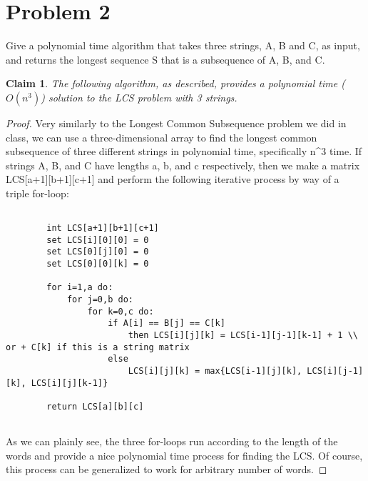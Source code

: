 \documentclass{article}
\author{Isaac B Goss\\ James Hahn\\ Jonathan Dyer}
\title{}
\date{}
\newtheorem{thm}{Claim}
\providecommand{\prob}[1]{\section*{Problem #1}}
\begin{document}
\maketitle

\prob{2}
Give a polynomial time algorithm that takes three strings, A, B and C, as input, and returns the longest sequence S that is a subsequence of A, B, and C.

\begin{thm}
The following algorithm, as described, provides a polynomial time ($O(n^3)$) solution to the LCS problem with 3 strings.
\end{thm}

\begin{proof}
    Very similarly to the Longest Common Subsequence problem we did in class, we can use a three-dimensional array to find the longest common subsequence of three different strings in polynomial time, specifically n^3 time. If strings A, B, and C have lengths a, b, and c respectively, then we make a matrix LCS[a+1][b+1][c+1] and perform the following iterative process by way of a triple for-loop:
    
    \begin{lstlisting}

        int LCS[a+1][b+1][c+1]
        set LCS[i][0][0] = 0
        set LCS[0][j][0] = 0
        set LCS[0][0][k] = 0
        
        for i=1,a do:
            for j=0,b do:
                for k=0,c do:
                    if A[i] == B[j] == C[k]
                        then LCS[i][j][k] = LCS[i-1][j-1][k-1] + 1 \\ or + C[k] if this is a string matrix
                    else
                        LCS[i][j][k] = max{LCS[i-1][j][k], LCS[i][j-1][k], LCS[i][j][k-1]}
                    
        return LCS[a][b][c]
        
    \end{lstlisting}
    
    As we can plainly see, the three for-loops run according to the length of the words and provide a nice polynomial time process for finding the LCS. Of course, this process can be generalized to work for arbitrary number of words.

\end{proof}
\end{document}
